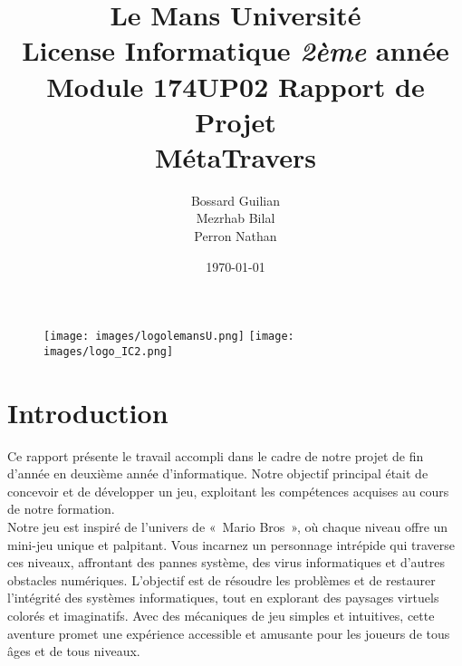 \documentclass[12pt,a4paper]{article}
\begin{document}
    \begin{figure}
    
        \texttt{[image: images/logolemansU.png]}
        \hspace{150pt}
        \texttt{[image: images/logo\_IC2.png]}
        
    \end{figure}
    
    \title{
        \color{blue}\textbf{Le Mans Université}\\
        \color{black}License Informatique \textit{2ème} année\\
        Module 174UP02 Rapport de Projet\\
        \textbf{MétaTravers}
    }
    
    \author{Bossard Guilian\\Mezrhab Bilal\\Perron Nathan}
    \date{\today}
    \maketitle
    \newpage

    \tableofcontents

    \newpage

    \section{Introduction}
        \tabto{1cm} Ce rapport présente le travail accompli dans le cadre de notre projet de fin d'année en deuxième année d'informatique. Notre objectif principal était de concevoir et de développer un jeu, exploitant les compétences acquises au cours de notre formation. \\
        
            \tabto{1cm} Notre jeu est inspiré de l'univers de «~Mario Bros~», où chaque niveau offre un mini-jeu unique et palpitant. Vous incarnez un personnage intrépide qui traverse ces niveaux, affrontant des pannes système, des virus informatiques et d'autres obstacles numériques. L'objectif est de résoudre les problèmes et de restaurer l'intégrité des systèmes informatiques, tout en explorant des paysages virtuels colorés et imaginatifs. Avec des mécaniques de jeu simples et intuitives, cette aventure promet une expérience accessible et amusante pour les joueurs de tous âges et de tous niveaux.\\\\
             
\end{document}
